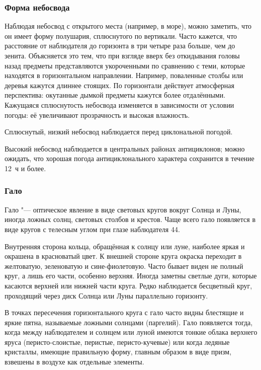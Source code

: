 \subsubsection{Форма небосвода}

Наблюдая небосвод с открытого места (например, в море), можно
заметить, что он имеет форму полушария, сплюснутого по
вертикали. Часто кажется, что расстояние от наблюдателя до горизонта в
три четыре раза больше, чем до зенита. Объясняется это тем, что при
взгляде вверх без откидывания головы назад предметы представляются
укороченными по сравнению с теми, которые находятся в горизонтальном
направлении.  Например, поваленные столбы или деревья кажутся длиннее
стоящих. По горизонтали действует атмосферная перспектива: окутанные
дымкой предметы кажутся более отдалёнными. Кажущаяся сплюснутость
небосвода изменяется в зависимости от условии погоды: её увеличивают
прозрачность и высокая влажность.

 Сплюснутый, низкий небосвод наблюдается перед циклональной
погодой.

 Высокий небосвод наблюдается в центральных районах
антициклонов; можно ожидать, что хорошая погода антициклонального
характера сохранится в течение 12~ч и более.

\subsubsection{Гало}

Гало "--- оптическое явление в виде световых кругов вокруг Солнца и
Луны, иногда ложных солнц, световых столбов и крестов. Чаще всего гало
появляется в виде кругов с телесным углом при глазе наблюдателя 44\gr.

Внутренняя сторона кольца, обращённая к солнцу или луне, наиболее
яркая и окрашена в красноватый цвет. К внешней стороне круга окраска
переходит в желтоватую, зеленоватую и сине-фиолетовую. Часто бывает
виден не полный круг, а лишь его части, особенно верхняя. Иногда
заметны светлые дуги, которые касаются верхней или нижней части
круга. Редко наблюдается бесцветный круг, проходящий через диск Солнца
или Луны параллельно горизонту.

В точках пересечения горизонтального круга с гало часто видны
блестящие и яркие пятна, называемые ложными солнцами (паргелий). Гало
появляется тогда, когда между наблюдателем и солнцем или луной имеются
тонкие облака верхнего яруса (перисто-слоистые, перистые,
перисто-кучевые) или когда ледяные кристаллы, имеющие правильную
форму, главным образом в виде призм, взвешены в воздухе как отдельные
элементы.

